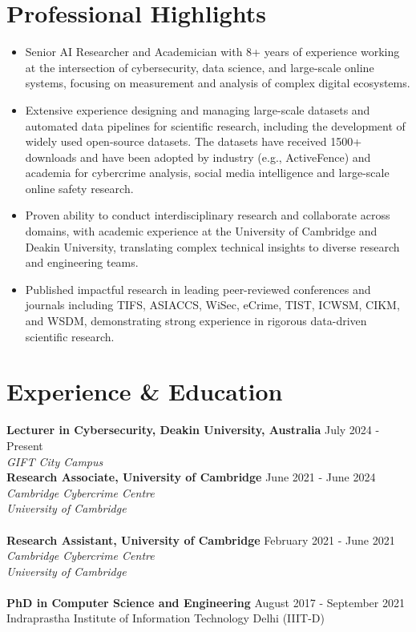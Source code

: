 \documentclass[margin, centered]{res}
\begin{document}
\begin{resume}
\section{Professional Highlights}
\begin{itemize}[leftmargin=*]

\item Senior AI Researcher and Academician with 8+ years of experience working at the intersection of cybersecurity, data science, and large-scale online systems, focusing on measurement and analysis of complex digital ecosystems.

\item Extensive experience designing and managing large-scale datasets and automated data pipelines for scientific research, including the development of widely used open-source datasets. The datasets have received 1500+ downloads and have been adopted by industry (e.g., ActiveFence) and academia for cybercrime analysis,  social media intelligence and large-scale online safety research.

\item Proven ability to conduct interdisciplinary research and collaborate across domains, with academic experience at the University of Cambridge and Deakin University, translating complex technical insights to diverse research and engineering teams.

\item Published impactful research in leading peer-reviewed conferences and journals including TIFS, ASIACCS, WiSec, eCrime, TIST, ICWSM, CIKM, and WSDM, demonstrating strong experience in rigorous data-driven scientific research.

\end{itemize}
\section{Experience \& Education}
\textbf{Lecturer in Cybersecurity, Deakin University, Australia} \hfill July 2024 - Present\\ 
\emph{GIFT City Campus}\\
\textbf{Research Associate, University of Cambridge} \hfill June 2021 - June 2024\\
\emph{Cambridge Cybercrime Centre \\
University of Cambridge
} \\
\\ [-2mm]
\textbf{Research Assistant, University of Cambridge} \hfill February 2021 - June 2021\\
\emph{Cambridge Cybercrime Centre \\
University of Cambridge
} \\\\ [-2mm]
\textbf{PhD in Computer Science and Engineering} \hfill August 2017 - September 2021 \\
Indraprastha Institute of Information Technology Delhi (IIIT-D)




\end{resume}
\end{document}
